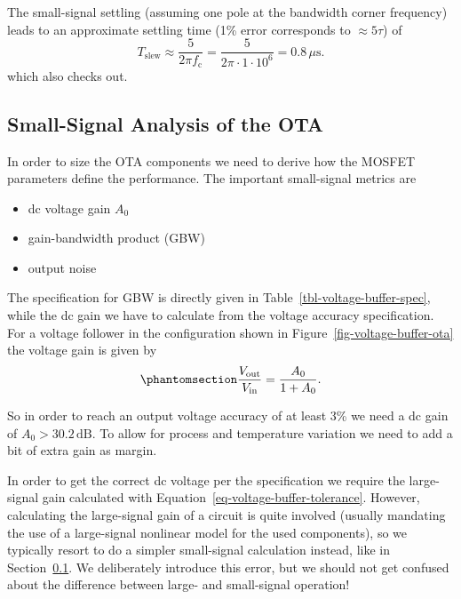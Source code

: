 \documentclass[
  a4paper,
  DIV=11,
  numbers=noendperiod]{scrartcl}
\providecommand{\tightlist}{%
  \setlength{\itemsep}{0pt}\setlength{\parskip}{0pt}}\usepackage{longtable,booktabs,array}
\begin{document}
The small-signal settling (assuming one pole at the bandwidth corner
frequency) leads to an approximate settling time (1\% error corresponds
to \(\approx 5 \tau\)) of \[
T_\mathrm{slew} \approx \frac{5}{2 \pi f_\mathrm{c}} = \frac{5}{2 \pi \cdot 1 \cdot 10^{6}} = 0.8\,\mu\text{s}.
\] which also checks out.

\subsection{Small-Signal Analysis of the
OTA}\label{sec-basic-ota-small-signal}

In order to size the OTA components we need to derive how the MOSFET
parameters define the performance. The important small-signal metrics
are

\begin{itemize}
\tightlist
\item
  dc voltage gain \(A_0\)
\item
  gain-bandwidth product (GBW)
\item
  output noise
\end{itemize}

The specification for GBW is directly given in
Table~\ref{tbl-voltage-buffer-spec}, while the dc gain we have to
calculate from the voltage accuracy specification. For a voltage
follower in the configuration shown in
Figure~\ref{fig-voltage-buffer-ota} the voltage gain is given by
\begin{equation}\phantomsection\label{eq-voltage-buffer-tolerance}{
\frac{V_\mathrm{out}}{V_\mathrm{in}} = \frac{A_0}{1 + A_0}.
}\end{equation}

So in order to reach an output voltage accuracy of at least 3\% we need
a dc gain of \(A_0 > 30.2\,\text{dB}\). To allow for process and
temperature variation we need to add a bit of extra gain as margin.

\begin{tcolorbox}[enhanced jigsaw, toprule=.15mm, titlerule=0mm, left=2mm, leftrule=.75mm, toptitle=1mm, breakable, colframe=quarto-callout-important-color-frame, colback=white, colbacktitle=quarto-callout-important-color!10!white, opacityback=0, arc=.35mm, coltitle=black, bottomtitle=1mm, title=\textcolor{quarto-callout-important-color}{\faExclamation}\hspace{0.5em}{Small-Signal vs.~Large-Signal Operation}, bottomrule=.15mm, rightrule=.15mm, opacitybacktitle=0.6]

In order to get the correct dc voltage per the specification we require
the large-signal gain calculated with
Equation~\ref{eq-voltage-buffer-tolerance}. However, calculating the
large-signal gain of a circuit is quite involved (usually mandating the
use of a large-signal nonlinear model for the used components), so we
typically resort to do a simpler small-signal calculation instead, like
in Section~\ref{sec-basic-ota-small-signal}. We deliberately introduce
this error, but we should not get confused about the difference between
large- and small-signal operation!

\end{tcolorbox}
\end{document}
